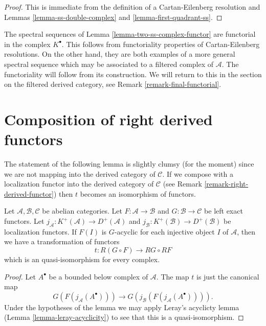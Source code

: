 \begin{proof}
This is immediate from the definition of a Cartan-Eilenberg resolution
and Lemmas \ref{lemma-ss-double-complex} and \ref{lemma-first-quadrant-ss}.
\end{proof}

\begin{remark}
\label{remark-functorial-ss}
The spectral sequences of Lemma \ref{lemma-two-ss-complex-functor}
are functorial in the complex $K^\bullet$. This follows from functoriality
properties of Cartan-Eilenberg resolutions. On the other hand, they are
both examples of a more general spectral sequence which may be associated
to a filtered complex of $\mathcal{A}$. The functoriality will follow from
its construction. We will return to this in the section on the filtered
derived category, see Remark \ref{remark-final-functorial}.
\end{remark}





\section{Composition of right derived functors}
\label{section-composition-right-derived-functors}

\noindent
The statement of the following lemma is slightly clumsy (for the moment)
since we are not mapping into the derived category of $\mathcal{C}$.
If we compose with a localization functor into the derived category
of $\mathcal{C}$ (see Remark \ref{remark-right-derived-functor})
then $t$ becomes an isomorphism of functors.

\begin{lemma}
\label{lemma-compose-derived-functors}
Let $\mathcal{A}, \mathcal{B}, \mathcal{C}$ be abelian categories.
Let $F : \mathcal{A} \to \mathcal{B}$
and $G : \mathcal{B} \to \mathcal{C}$ be left exact functors.
Let $j_{\mathcal{A}} : K^{+}(\mathcal{A}) \to D^{+}(\mathcal{A})$ and
$j_{\mathcal{B}} : K^{+}(\mathcal{B}) \to D^{+}(\mathcal{B})$ be
localization functors. If $F(I)$ is $G$-acyclic for each injective object $I$
of $\mathcal{A}$, then we have a transformation of functors
$$
t : R(G \circ F) \longrightarrow RG \circ RF
$$
which is an quasi-isomorphism for every complex.
\end{lemma}

\begin{proof}
Let $A^\bullet$ be a bounded below complex of $\mathcal{A}$.
The map $t$ is just the canonical map
$$
G(F(j_{\mathcal{A}}(A^\bullet)))
\longrightarrow
G(j_{\mathcal{B}}(F(j_{\mathcal{A}}(A^\bullet)))).
$$
Under the hypotheses of the lemma we may apply
Leray's acyclicty lemma (Lemma \ref{lemma-leray-acyclicity})
to see that this is a quasi-isomorphism.
\end{proof}

